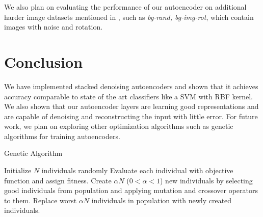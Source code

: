 \documentclass[conference]{IEEEtran}
\begin{document}
We also plan on evaluating the performance of our autoencoder on additional harder image datasets mentioned in \cite{vincent2010stacked}, such as \textit{bg-rand, bg-img-rot}, which contain images with noise and rotation. 

\section{Conclusion}
We have implemented stacked denoising autoencoders and shown that it achieves accuracy comparable to state of the art classifiers like a SVM with RBF kernel. We also shown that our autoencoder layers are learning good representations and are capable of denoising and reconstructing the input with little error. For future work, we plan on exploring other optimization algorithms such as genetic algorithms for training autoencoders. 

\begin{algorithm}[h]
\caption{Genetic Algorithm}
\label{alg:genetic}
\begin{algorithmic}
\STATE Initialize $N$ individuals randomly
	\STATE Evaluate each individual with objective function and assign fitness.
	\STATE Create $\alpha N$ ($0 < \alpha < 1$) new individuals by selecting good individuals from population and applying mutation and crossover operators to them.
	\STATE Replace worst $\alpha N$ individuals in population with newly created individuals.
\ENDFOR
\end{algorithmic}
\end{algorithm}



\end{document}

